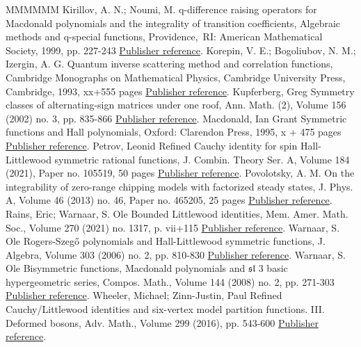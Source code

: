\documentclass[11pt]{article}
\theoremstyle{definition}
\begin{document}
\begin{thebibliography}{MMMMMM}
 Kirillov, A. N.; Noumi, M. q-difference raising operators for Macdonald polynomials and the integrality of transition coefficients, Algebraic methods and q-special functions, Providence, RI: American Mathematical Society, 1999, pp. 227-243 \href{https://alco.centre-mersenne.org/articles/10.5802/alco.251/#KN99}{Publisher reference}.
 Korepin, V. E.; Bogoliubov, N. M.; Izergin, A. G. Quantum inverse scattering method and correlation functions, Cambridge Monographs on Mathematical Physics, Cambridge University Press, Cambridge, 1993, xx+555 pages \href{https://alco.centre-mersenne.org/articles/10.5802/alco.251/#KBI93}{Publisher reference}.
 Kupferberg, Greg Symmetry classes of alternating-sign matrices under one roof, Ann. Math. (2), Volume 156 (2002) no. 3, pp. 835-866 \href{https://alco.centre-mersenne.org/articles/10.5802/alco.251/#Kup02}{Publisher reference}.
 Macdonald, Ian Grant Symmetric functions and Hall polynomials, Oxford: Clarendon Press, 1995, x + 475 pages \href{https://alco.centre-mersenne.org/articles/10.5802/alco.251/#Mac95}{Publisher reference}.
 Petrov, Leonid Refined Cauchy identity for spin Hall-Littlewood symmetric rational functions, J. Combin. Theory Ser. A, Volume 184 (2021), Paper no. 105519, 50 pages \href{https://alco.centre-mersenne.org/articles/10.5802/alco.251/#Pet21}{Publisher reference}.
 Povolotsky, A. M. On the integrability of zero-range chipping models with factorized steady states, J. Phys. A, Volume 46 (2013) no. 46, Paper no. 465205, 25 pages \href{https://alco.centre-mersenne.org/articles/10.5802/alco.251/#Pov13}{Publisher reference}.
 Rains, Eric; Warnaar, S. Ole Bounded Littlewood identities, Mem. Amer. Math. Soc., Volume 270 (2021) no. 1317, p. vii+115 \href{https://alco.centre-mersenne.org/articles/10.5802/alco.251/#RW21}{Publisher reference}.
 Warnaar, S. Ole Rogers-Szegő polynomials and Hall-Littlewood symmetric functions, J. Algebra, Volume 303 (2006) no. 2, pp. 810-830 \href{https://alco.centre-mersenne.org/articles/10.5802/alco.251/#War06}{Publisher reference}.
 Warnaar, S. Ole Bisymmetric functions, Macdonald polynomials and \(\mathfrak{s}\)\(\mathfrak{l}\) 3  basic hypergeometric series, Compos. Math., Volume 144 (2008) no. 2, pp. 271-303 \href{https://alco.centre-mersenne.org/articles/10.5802/alco.251/#War08}{Publisher reference}.
 Wheeler, Michael; Zinn-Justin, Paul Refined Cauchy/Littlewood identities and six-vertex model partition functions. III. Deformed bosons, Adv. Math., Volume 299 (2016), pp. 543-600 \href{https://alco.centre-mersenne.org/articles/10.5802/alco.251/#WZJ16}{Publisher reference}.
\end{thebibliography}
\end{document}
